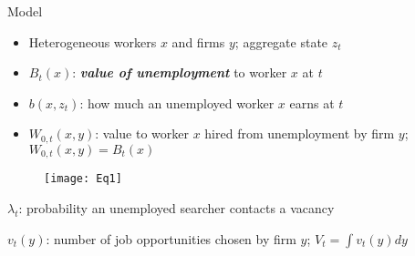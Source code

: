 \documentclass[10pt]{beamer}
\begin{document}
\begin{frame}{Model}

\begin{itemize}
\item Heterogeneous workers $x$ and firms $y$; aggregate state $z_t$

\item $B_t(x)$: \textbf{\textit{value of unemployment}} to worker $x$ at $t$ 
\item $b(x, z_t)$: how much an unemployed worker $x$ earns at $t$ 
\item $W_{0, t}(x, y)$: value to worker $x$ hired from unemployment by firm $y$; $W_{0, t}(x, y) = B_t(x)$

\end{itemize}

\begin{figure}
    \texttt{[image: Eq1]}
  \end{figure}

\begin{itemize}

 \begin{footnotesize}

\item $\lambda_t$: probability an unemployed searcher contacts a vacancy
\item $v_t(y)$: number of job opportunities chosen by firm $y$; $V_t = \int v_t(y) dy$

 \end{footnotesize}

\end{itemize}

\end{frame}
\end{document}
